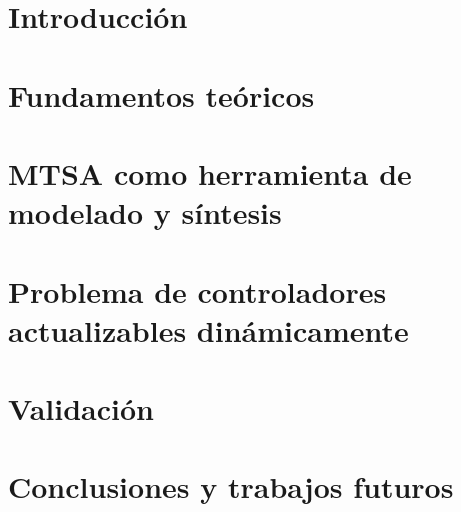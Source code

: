 \chapter{Introducción}
\label{introduction}


\label{motivation}



\chapter{Fundamentos teóricos}
\label{background}









\chapter{MTSA como herramienta de modelado y síntesis}
\label{MTSA_tool}






\chapter{Problema de controladores actualizables dinámicamente}
\label{updating_controller_chapter}






\chapter{Validación}
\label{validation}





\chapter{Conclusiones y trabajos futuros}
\label{discusion}





